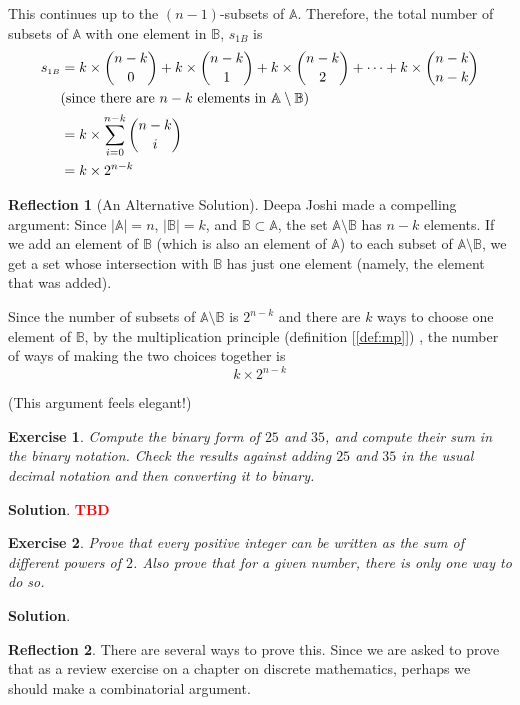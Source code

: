 \documentclass[11pt]{book}
\theoremstyle{definition}
\theoremstyle{plain}
\newtheorem{exercise}{Exercise}
\theoremstyle{definition}
\theoremstyle{problemstyle}
\theoremstyle{remark}
\theoremstyle{definition}
\newtheorem{reflection}{Reflection}
\newcommand{\tbd}{
    \vspace{5mm}
    \textbf{\textcolor{red}{\Large{TBD}}}
    \vspace{5mm}
}
\begin{document}
This continues up to the $(n-1)$-subsets of $\mathbb{A}$. Therefore, the total number of subsets of $\mathbb{A}$ with one element in $\mathbb{B}$, $s_{\scriptscriptstyle 1B}$ is
\begin{align*}
    s_{\scriptscriptstyle 1B}&=k\times\dbinom{n-k}{0}+k\times\dbinom{n-k}{1}+k\times\dbinom{n-k}{2}+\dots+k\times\dbinom{n-k}{n-k}\\
    &\text{(since there are $n-k$ elements in $\mathbb{A}\setminus\mathbb{B}$)}\\
    &=k\times\sum_{i=0}^{n-k}\dbinom{n-k}{i}\\
    &=k\times2^{n-k}
\end{align*}
\begin{reflection}[An Alternative Solution]
    Deepa Joshi made a compelling argument: Since $\lvert\mathbb{A}\rvert=n$, $\lvert\mathbb{B}\rvert=k$, and $\mathbb{B}\subset\mathbb{A}$, the set $\mathbb{A}\setminus\mathbb{B}$ has $n-k$ elements. If we add an element of $\mathbb{B}$ (which is also an element of $\mathbb{A}$) to each subset of $\mathbb{A}\setminus\mathbb{B}$, we get a set whose intersection with $\mathbb{B}$ has just one element (namely, the element that was added).

    Since the number of subsets of $\mathbb{A}\setminus\mathbb{B}$ is $2^{n-k}$ and there are $k$ ways to choose one element of $\mathbb{B}$, by the multiplication principle (definition [\ref{def:mp}]) , the number of ways of making the two choices together is 
    \[
        k\times2^{n-k}
    \]

    (This argument feels elegant!)
\end{reflection}
\begin{exercise}
    \label{ex:1.8.22}
    Compute the binary form of $25$ and $35$, and compute their sum in the binary notation. Check the results against adding $25$ and $35$ in the usual decimal notation and then converting it to binary.
\end{exercise}
\textbf{Solution}. \tbd
\begin{exercise}
    \label{ex:1.8.23}
    Prove that every positive integer can be written as the sum of different powers of $\mathit{2}$. Also prove that for a given number, there is only one way to do so.
\end{exercise}
\textbf{Solution}.
\begin{reflection}
    There are several ways to prove this. Since we are asked to prove that as a review exercise on a chapter on discrete mathematics, perhaps we should make a combinatorial argument. 
\end{reflection}
\end{document}
